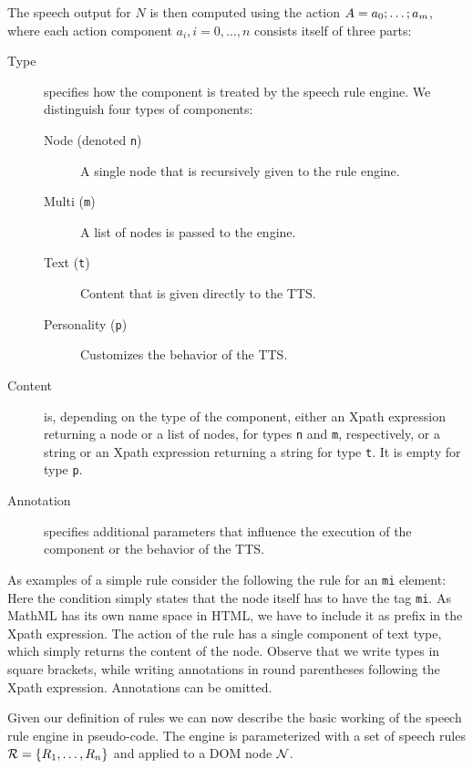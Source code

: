 \documentclass{sig-alternate}
\begin{document}
The speech output for $N$ is then computed using the action $A =
a_0;\ldots;a_m$, where each action component $a_i, i=0,\ldots,n$
consists itself of three parts: 
\begin{description}
\item[Type] specifies how the component is treated by the speech rule engine. We
  distinguish four types of components:
  \begin{description}
  \item[Node (denoted \texttt{n})] A single node that is recursively given to
    the rule engine.
  \item[Multi (\texttt{m})] A list of nodes is passed to the engine.
  \item[Text (\texttt{t})] Content that is given directly to the TTS.
  \item[Personality (\texttt{p})] Customizes the behavior of the TTS.
  \end{description}
\item[Content] is, depending on the type of the component, either an Xpath
  expression returning a node or a list of nodes, for types \texttt{n} and
  \texttt{m}, respectively, or a string or an Xpath expression returning a
  string for type \texttt{t}.  It is empty for type \texttt{p}.
\item[Annotation] specifies additional parameters that influence the execution
  of the component or the behavior of the TTS.
\end{description}

As examples of a simple rule consider the following the rule for an \texttt{mi}
element:  Here the condition simply states
that the node itself has to have the tag \texttt{mi}. As MathML has its own name
space in HTML, we have to include it as prefix in the Xpath expression. The
action of the rule has a single component of text type, which simply returns the
content of the node. Observe that we write types in square brackets, while
writing annotations in round parentheses following the Xpath
expression. Annotations can be omitted.

Given our definition of rules we can now describe the basic working of the
speech rule engine in pseudo-code. The engine is parameterized with a set of
speech rules ${\cR}={\{R_1,\ldots,R_n\}}$ and applied to a DOM node $\cN$.
\end{document}

